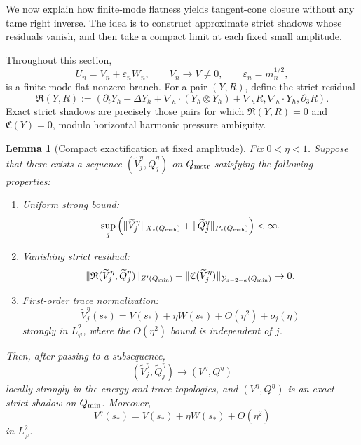 \documentclass[11pt]{article}
\numberwithin{equation}{section}
\theoremstyle{plain}
\newtheorem{lemma}{Lemma}[section]
\theoremstyle{definition}
\theoremstyle{remark}
\newcommand{\nabh}{\nabla_h}
\newcommand{\calC}{\mathfrak C}
\newcommand{\calY}{\mathcal Y}
\begin{document}
We now explain how finite-mode flatness yields tangent-cone closure without any tame right inverse.
The idea is to construct approximate strict shadows whose residuals vanish, and then take a compact
limit at each fixed small amplitude.

Throughout this section,
\[
        U_n=V_n+\varepsilon_nW_n,
        \qquad
        V_n\to V\neq0,
        \qquad
        \varepsilon_n=m_n^{1/2},
\]
is a finite-mode flat nonzero branch.  For a pair \((Y,R)\), define the strict residual
\[
\mathfrak R(Y,R)
:=
\left(
\partial_tY_h-\Delta Y_h+\nabh\cdot(Y_h\otimes Y_h)+\nabh R,
\nabh\cdot Y_h,
\partial_3R
\right).
\]
Exact strict shadows are precisely those pairs for which
\(\mathfrak R(Y,R)=0\) and \(\calC(Y)=0\), modulo horizontal harmonic pressure ambiguity.

\begin{lemma}[Compact exactification at fixed amplitude]
\label{pIII:lem:compact-exactification-fixed-amplitude}
Fix \(0<\eta<1\).  Suppose that there exists a sequence
\((\widetilde V_j^\eta,\widetilde Q_j^\eta)\) on \(Q_{\rm mstr}\) satisfying the following properties:
\begin{enumerate}[label=(\roman*)]
\item Uniform strong bound:
\[
        \sup_j
        \left(
        \|\widetilde V_j^\eta\|_{X_s(Q_{\rm msh})}
        +
        \|\widetilde Q_j^\eta\|_{P_s(Q_{\rm msh})}
        \right)<\infty.
\]
\item Vanishing strict residual:
\[
        \|\mathfrak R(\widetilde V_j^\eta,\widetilde Q_j^\eta)\|_{Z'(Q_{\rm min})}
        +
        \|\calC(\widetilde V_j^\eta)\|_{\calY_{s-2-a}(Q_{\rm min})}
        \to0.
\]
\item First-order trace normalization:
\[
        \widetilde V_j^\eta(s_*)
        =
        V(s_*)+\eta W(s_*)+O(\eta^2)+o_j(\eta)
\]
strongly in \(L^2_\varphi\), where the \(O(\eta^2)\) bound is independent of \(j\).
\end{enumerate}
Then, after passing to a subsequence,
\[
        (\widetilde V_j^\eta,\widetilde Q_j^\eta)
        \longrightarrow
        (V^\eta,Q^\eta)
\]
locally strongly in the energy and trace topologies, and \((V^\eta,Q^\eta)\) is an exact strict
shadow on \(Q_{\rm min}\).  Moreover,
\[
        V^\eta(s_*)=V(s_*)+\eta W(s_*)+O(\eta^2)
\]
in \(L^2_\varphi\).
\end{lemma}
\end{document}
